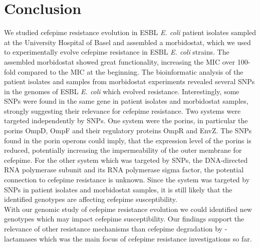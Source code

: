 \section{Conclusion}
We studied cefepime resistance evolution in ESBL \textit{E. coli} patient isolates sampled at the University Hospital of Basel and assembled a morbidostat, which we used to experimentally evolve cefepime resistance in ESBL \textit{E. coli} strains. The assembled morbidostat showed great functionality, increasing the MIC over 100-fold compared to the MIC at the beginning. The bioinformatic analysis of the patient isolates and samples from morbidostat experiments revealed several SNPs in the genomes of ESBL \textit{E. coli} which evolved resistance. Interestingly, some SNPs were found in the same gene in patient isolates and morbidostat samples, strongly suggesting their relevance for cefepime resistance. Two systems were targeted independently by SNPs. One system were the porins, in particular the porins OmpD, OmpF and their regulatory proteins OmpR and EnvZ. The SNPs found in the porin operons could imply, that the expression level of the porins is reduced, potentially increasing the impermeability of the outer membrane for cefepime. For the other system which was targeted by SNPs, the DNA-directed RNA polymerase subunit \textbeta \space and its RNA polymerase sigma factor, the potential connection to cefepime resistance is unknown. Since the system was targeted by SNPs in patient isolates and morbidostat samples, it is still likely that the identified genotypes are affecting cefepime susceptibility. \\
With our genomic study of cefepime resistance evolution we could identified new genotypes which may impact cefepime susceptibility. Our findings support the relevance of other resistance mechanisms than cefepime degradation by \textbeta-lactamases which was the main focus of cefepime resistance investigations so far.  

